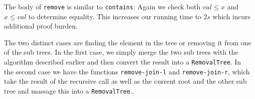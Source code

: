 The body of \texttt{remove} is similar to \texttt{contains}: Again we check both $val \leq x$ and $x \leq val$ to determine equality. This increases our running time to $2s$ which incurs additional proof burden.

The two distinct cases are finding the element in the tree or removing it from one of the sub trees. In the first case, we simply merge the two sub trees with the algorithm described earlier and then convert the result into a \texttt{RemovalTree}. In the second case we have the functions \texttt{remove-join-l} and \texttt{remove-join-r}, which take the result of the recursive call as well as the current root and the other sub tree and massage this into a \texttt{RemovalTree}..
